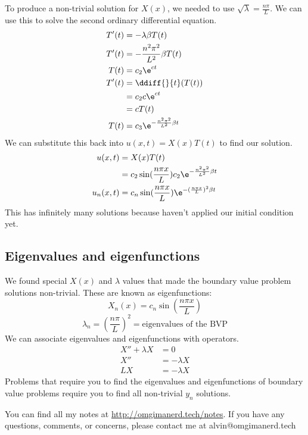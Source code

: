 \documentclass{math}
\begin{document}
To produce a non-trivial solution for \( X(x) \), we needed to use
\( \sqrt{\lambda} = \frac{n\pi}{L} \). We can use this to solve the second
ordinary differential equation.
\begin{align*}
  T'(t) &= -\lambda\beta T(t) \\
  T'(t) &= -\frac{n^2\pi^2}{L^2}\beta T(t) \\
  T(t) &= c_2\e^{ct} \\
  T'(t) &= \ddiff{}{t}(T(t)) \\
  &= c_2c\e^{ct} \\
  &= cT(t) \\
  T(t) &= c_3\e^{-\frac{n^2\pi^2}{L^2}\beta t}
\end{align*}
We can substitute this back into \( u(x,t) = X(x)T(t) \) to find our solution.
\begin{align*}
  u(x,t) &= X(x)T(t) \\
  &= c_2\sin(\frac{n\pi x}{L})c_2\e^{-\frac{n^2\pi^2}{L^2}\beta t} \\
  u_n(x,t) &= c_n\sin(\frac{n\pi x}{L})\e^{-(\frac{n\pi x}{L})^2\beta t}
\end{align*}
This has infinitely many solutions because haven't applied our initial condition
yet.

\subsection*{Eigenvalues and eigenfunctions}
We found special \( X(x) \) and \( \lambda \) values that made the boundary
value problem solutions non-trivial. These are known as eigenfunctions:
\[ X_n(x) = c_n\sin(\frac{n\pi x}{L}) \]
\[ \lambda_n = (\frac{n\pi}{L})^2 = \text{eigenvalues of the BVP} \]
We can associate eigenvalues and eigenfunctions with operators.
\begin{align*}
  X''+\lambda X &= 0 \\
  X'' &= -\lambda X \\
  LX &= -\lambda X
\end{align*}
Problems that require you to find the eigenvalues and eigenfunctions of
boundary value problems require you to find all non-trivial \( y_n \)
solutions.

\begin{center}
  You can find all my notes at \url{http://omgimanerd.tech/notes}. If you have
  any questions, comments, or concerns, please contact me at
  alvin@omgimanerd.tech
\end{center}
\end{document}
